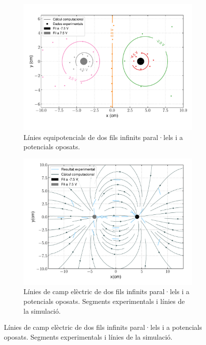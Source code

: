 \documentclass[11pt]{article}
\begin{document}
\begin{figure}[h]
    \centering
    \begin{subfigure}{0.495\textwidth}
        \centering
        \includegraphics[width=\textwidth]{fils_combi.pdf}
        \caption{Línies equipotencials de dos fils infinits paral·lels i a potencials oposats.}
        \label{fig: fils_pot}
    \end{subfigure}
    \begin{subfigure}{0.495\textwidth} 
        \centering
        \includegraphics[width=\textwidth]{fils_camp.pdf}
        \caption{Línies de camp elèctric de dos fils infinits paral·lels i a potencials oposats. Segments experimentals i línies de la simulació.}
        \label{fig: fils_camp}
    \end{subfigure}
\end{figure}
\end{document}
